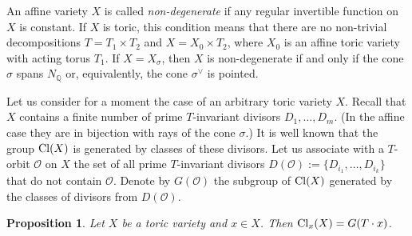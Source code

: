 \documentclass[12pt,a4paper]{amsart}
\theoremstyle{plain}
\newtheorem{proposition}{Proposition}
\theoremstyle{definition}
\begin{document}
An affine variety $X$ is called {\it non-degenerate} if any regular invertible function on
$X$ is constant. If $X$ is toric, this condition means that there are no non-trivial
decompositions $T=T_1\times T_2$ and $X=X_0\times T_2$, where $X_0$ is an affine toric variety
with acting torus $T_1$. If $X=X_{\sigma}$, then $X$ is non-degenerate if and only if
the cone $\sigma$ spans $N_{{\mathbb Q}}$ or, equivalently, the cone $\sigma^{\vee}$ is pointed.

Let us consider for a moment the case of an arbitrary toric variety $X$.
Recall that $X$ contains a finite number of prime $T$-invariant divisors
$D_1,\ldots,D_m$. (In the affine case they are in bijection
with rays of the cone $\sigma$.) It is well known that the group ${\mathop{\rm Cl}}(X)$ is
generated by classes of these divisors. Let us associate with a $T$-orbit ${{\mathcal{O}}}$
on $X$ the set of all prime $T$-invariant divisors
$D({{\mathcal{O}}}) := \{D_{i_1},\ldots,D_{i_k}\}$
that do not contain ${{\mathcal{O}}}$. Denote by $G({{\mathcal{O}}})$ the subgroup of ${\mathop{\rm Cl}}(X)$
generated by the classes of divisors from $D({{\mathcal{O}}})$.

\begin{proposition} \label{pr1}
Let $X$ be a toric variety and $x\in X$. Then
${\mathop{\rm Cl}}_x(X)=G(T\cdot x)$.
\end{proposition}
\end{document}
